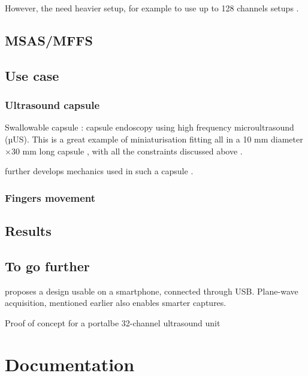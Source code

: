 \documentclass[conference]{IEEEtran}
\begin{document}
However, the need heavier setup, for example to use up to 128 channels setups \cite{assef_flexible_2015}.




\subsection{MSAS/MFFS}

\cite{ylitalo_ultrasound_1994}

\cite{heuvel_development_2017}


\subsection{Use case}

\subsubsection{Ultrasound capsule}

Swallowable capsule : capsule endoscopy using  high frequency microultrasound (µUS). This is a great example of miniaturisation fitting all in a  10 mm diameter ×30 mm long capsule , with all the constraints discussed above \cite{cox_ultrasound_2017}.

further develops mechanics used in such a capsule \cite{wang_development_2017}.

\subsubsection{Fingers movement}

\cite{sikdar_novel_2014}

\subsection{Results}


\subsection{To go further}

\cite{kim_smart-phone_2017} proposes a design usable on a smartphone, connected through USB. Plane-wave acquisition, mentioned earlier \cite{hewener_mobile_2015} also enables smarter captures.


 
Proof of concept for a portalbe 32-channel ultrasound unit \cite{kim_single_2012}

\section{Documentation}
\end{document}
